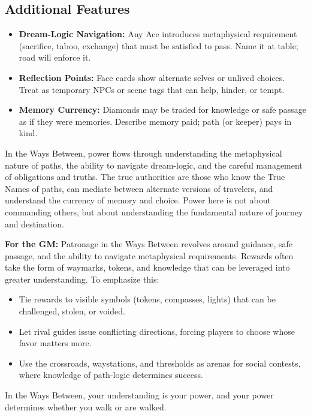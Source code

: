 \subsection*{Additional Features}
\begin{itemize}
\item \textbf{Dream-Logic Navigation:} Any Ace introduces metaphysical requirement (sacrifice, taboo, exchange) that must be satisfied to pass. Name it at table; road will enforce it.
\item \textbf{Reflection Points:} Face cards show alternate selves or unlived choices. Treat as temporary NPCs or scene tags that can help, hinder, or tempt.
\item \textbf{Memory Currency:} Diamonds may be traded for knowledge or safe passage as if they were memories. Describe memory paid; path (or keeper) pays in kind.
\end{itemize}

\begin{tcolorbox}[colback=black!3,colframe=black!40!white,title={Patronage \& Power}]
In the Ways Between, power flows through understanding the metaphysical nature of paths, the ability to navigate dream-logic, and the careful management of obligations and truths. The true authorities are those who know the True Names of paths, can mediate between alternate versions of travelers, and understand the currency of memory and choice. Power here is not about commanding others, but about understanding the fundamental nature of journey and destination.

\textbf{For the GM:}  
Patronage in the Ways Between revolves around guidance, safe passage, and the ability to navigate metaphysical requirements. Rewards often take the form of waymarks, tokens, and knowledge that can be leveraged into greater understanding. To emphasize this:
\begin{itemize}
\item Tie rewards to visible symbols (tokens, compasses, lights) that can be challenged, stolen, or voided.
\item Let rival guides issue conflicting directions, forcing players to choose whose favor matters more.
\item Use the crossroads, waystations, and thresholds as arenas for social contests, where knowledge of path-logic determines success.
\end{itemize}
In the Ways Between, your understanding is your power, and your power determines whether you walk or are walked.
\end{tcolorbox}

